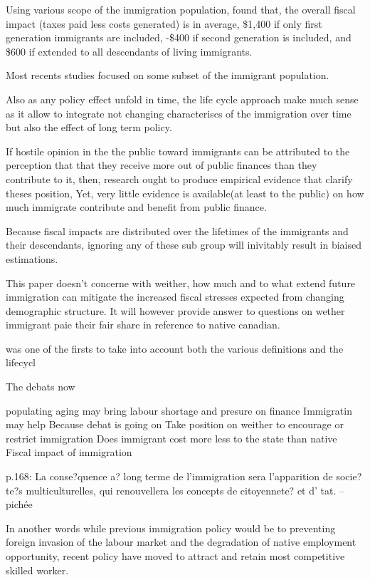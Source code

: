   Using various scope of the immigration population, \citep{Lee:1998fs}  found that, the overall fiscal impact (taxes paid less costs generated) is in average, \$1,400 if only first generation immigrants are included, -\$400 if second generation is included, and  \$600 if extended to all descendants of living immigrants.

  Most recents studies focused on some subset of the immigrant population.

  Also as any policy effect unfold in time, the life cycle approach make much sense as it allow to integrate not changing characteriscs of the immigration over time but also the effect of long term policy.





  If hostile opinion in the the public toward immigrants can be attributed to the perception that  that they receive more out of public finances than they contribute to it, then, research ought to produce empirical evidence that clarify theses position, Yet, very little evidence is available(at least to the public) on how much immigrate contribute and benefit from public finance.

  Because fiscal impacts are distributed over the lifetimes of the immigrants and their descendants, ignoring any of these sub group will inivitably result in biaised estimations.


  This paper doesn't concerne with weither, how much and to what extend future immigration can mitigate the increased fiscal stresses expected from changing demographic structure. It will however provide answer to questions on wether immigrant paie their fair share in reference to native canadian.




  \citep{Lee:1998fs} was one of the firsts  to take into account both the various definitions and the lifecycl


  The debats now

populating aging may bring labour shortage and presure on finance
Immigratin may help
Because debat is going on
Take position on weither to encourage or restrict immigration
Does immigrant cost more less to the state than native
Fiscal impact of immigration


p.168: La conse?quence a? long terme de l’immigration sera l’apparition de socie?te?s multiculturelles, qui renouvellera les concepts de citoyennete? et d’ tat. -- pichée


In another words while previous immigration policy would be to preventing foreign invasion of the labour market and the degradation of native employment opportunity, recent policy have moved to attract and retain most competitive skilled worker.



